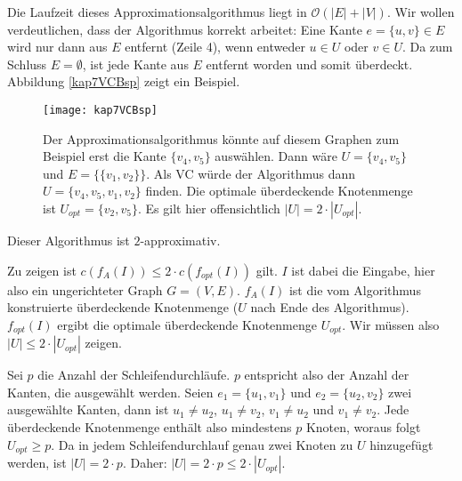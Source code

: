 Die Laufzeit dieses Approximationsalgorithmus liegt in $\mathcal{O}(|E| + |V|)$. Wir wollen verdeutlichen, dass der Algorithmus korrekt arbeitet: Eine Kante $e = \{ u, v \} \in E$ wird nur dann aus $E$ entfernt (Zeile 4), wenn entweder $u \in U$ oder $v \in U$. Da zum Schluss $E = \emptyset$, ist jede Kante aus $E$ entfernt worden und somit überdeckt. Abbildung \vref{kap7VCBsp} zeigt ein Beispiel.

\begin{figure}[htb]
  \centering
  \texttt{[image: kap7VCBsp]}
  \caption{Der Approximationsalgorithmus könnte auf diesem Graphen zum Beispiel erst die Kante $\{v_4, v_5\}$ auswählen. Dann wäre $U=\{v_4, v_5\}$ und $E=\{\{v_1, v_2\}\}$. Als VC würde der Algorithmus dann $U=\{v_4, v_5, v_1, v_2\}$ finden. Die optimale überdeckende Knotenmenge ist $U_{opt} = \{ v_2, v_5 \}$. Es gilt hier offensichtlich $|U| = 2 \cdot |U_{opt}|$.}
  \label{kap7VCBsp}
\end{figure}

\begin{Satz}
  \hspace{\parindent}Dieser Algorithmus ist $2$-approximativ.
\end{Satz}

\begin{Bew}
  \hspace{\parindent}Zu zeigen ist $c(f_A(I)) \le 2 \cdot c(f_{opt}(I))$ gilt. $I$ ist dabei die Eingabe, hier also ein ungerichteter Graph $G=(V,E)$. $f_A(I)$ ist die vom Algorithmus konstruierte überdeckende Knotenmenge ($U$ nach Ende des Algorithmus). $f_{opt}(I)$ ergibt die optimale überdeckende Knotenmenge $U_{opt}$. Wir müssen also $|U| \le 2 \cdot |U_{opt}|$ zeigen.
  
  Sei $p$ die Anzahl der Schleifendurchläufe. $p$ entspricht also der Anzahl der Kanten, die ausgewählt werden. Seien $e_1 = \{ u_1, v_1 \}$ und $e_2 = \{u_2, v_2\}$ zwei ausgewählte Kanten, dann ist $u_1 \neq u_2$, $u_1 \neq v_2$, $v_1 \neq u_2$ und $v_1 \neq v_2$. Jede überdeckende Knotenmenge enthält also mindestens $p$ Knoten, woraus folgt $U_{opt} \ge p$. Da in jedem Schleifendurchlauf genau zwei Knoten zu $U$ hinzugefügt werden, ist $|U| = 2 \cdot p$. Daher: $|U| = 2 \cdot p \le 2 \cdot |U_{opt}|$.
\end{Bew}

